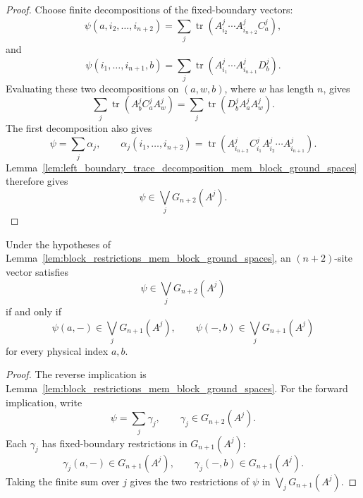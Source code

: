 \begin{proof}
    \leanok
    Choose finite decompositions of the fixed-boundary vectors:
    \[
        \psi(a,i_2,\ldots,i_{n+2})
        =
        \sum_j
        \operatorname{tr}\!\left(
        A^j_{i_2}\cdots A^j_{i_{n+2}}C^j_a
        \right),
    \]
    and
    \[
        \psi(i_1,\ldots,i_{n+1},b)
        =
        \sum_j
        \operatorname{tr}\!\left(
        A^j_{i_1}\cdots A^j_{i_{n+1}}D^j_b
        \right).
    \]
    Evaluating these two decompositions on
    \((a,w,b)\), where \(w\) has length \(n\), gives
    \[
        \sum_j\operatorname{tr}\!\left(A^j_bC^j_aA^j_w\right)
        =
        \sum_j\operatorname{tr}\!\left(D^j_bA^j_aA^j_w\right).
    \]
    The first decomposition also gives
    \[
        \psi=\sum_j\alpha_j,\qquad
        \alpha_j(i_1,\ldots,i_{n+2})
        =
        \operatorname{tr}\!\left(
        A^j_{i_{n+2}}C^j_{i_1}
        A^j_{i_2}\cdots A^j_{i_{n+1}}
        \right).
    \]
    Lemma~\ref{lem:left_boundary_trace_decomposition_mem_block_ground_spaces}
    therefore gives
    \[
        \psi\in\bigvee_jG_{n+2}(A^j).
    \]
\end{proof}

\begin{lemma}
    \label{lem:block_restrictions_iff_block_ground_spaces}
    \leanok
    Under the hypotheses of
    Lemma~\ref{lem:block_restrictions_mem_block_ground_spaces}, an
    \((n+2)\)-site vector satisfies
    \[
        \psi\in\bigvee_jG_{n+2}(A^j)
    \]
    if and only if
    \[
        \psi(a,-)\in\bigvee_jG_{n+1}(A^j),
        \qquad
        \psi(-,b)\in\bigvee_jG_{n+1}(A^j)
    \]
    for every physical index \(a,b\).
\end{lemma}

\begin{proof}
    \leanok
    The reverse implication is
    Lemma~\ref{lem:block_restrictions_mem_block_ground_spaces}.  For the
    forward implication, write
    \[
        \psi=\sum_j\gamma_j,\qquad \gamma_j\in G_{n+2}(A^j).
    \]
    Each \(\gamma_j\) has fixed-boundary restrictions in \(G_{n+1}(A^j)\):
    \[
        \gamma_j(a,-)\in G_{n+1}(A^j),
        \qquad
        \gamma_j(-,b)\in G_{n+1}(A^j).
    \]
    Taking the finite sum over \(j\) gives the two restrictions of \(\psi\) in
    \(\bigvee_jG_{n+1}(A^j)\).
\end{proof}

